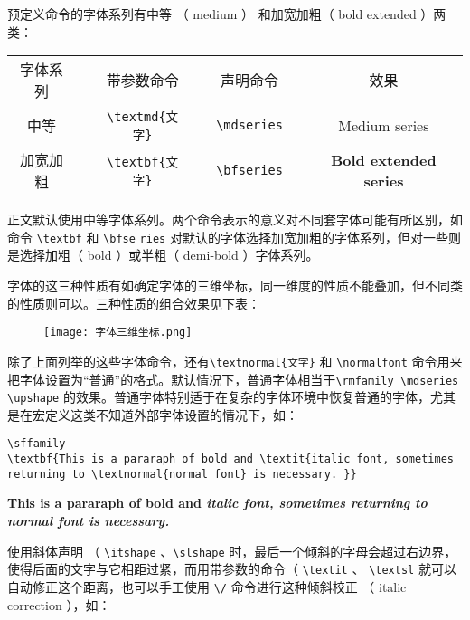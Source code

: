 预定义命令的字体系列有中等 （ medium ） 和加宽加粗（ bold extended ）两类：
\begin{table}[H]
    \centering
    \begin{tabular}{ccccccc}
        字体系列 && 带参数命令 && 声明命令 && 效果 \\ 
        中等 && \verb|\textmd{文字}| && \verb|\mdseries| && \textmd{Medium series} \\ 
        加宽加粗 && \verb|\textbf{文字}|  && \verb|\bfseries| && \textbf{Bold extended series} \\
    \end{tabular}
\end{table}

正文默认使用中等字体系列。两个命令表示的意义对不同套字体可能有所区别，如命令 \verb|\textbf| 和
 \verb|\bfse| \verb|ries| 对默认的字体选择加宽加粗的字体系列，但对一些则是选择加粗（ bold ）或半粗（ demi-bold ）字体系列。

字体的这三种性质有如确定字体的三维坐标，同一维度的性质不能叠加，但不同类的性质则可以。三种性质的组合效果见下表：

\begin{figure}[H]
    \centering
    \texttt{[image: 字体三维坐标.png]}
\end{figure}

除了上面列举的这些字体命令，还有\verb|\textnormal{文字}| 和 \verb|\normalfont| 命令用来把字体设置为“普通”的格式。默认情况下，普通字体相当于\verb|\rmfamily \mdseries \upshape| 的效果。普通字体特别适于在复杂的字体环境中恢复普通的字体，尤其是在宏定义这类不知道外部字体设置的情况下，如：

\begin{minipage}[t]{0.45\textwidth}
\begin{lstlisting}
\sffamily
\textbf{This is a pararaph of bold and \textit{italic font, sometimes returning to \textnormal{normal font} is necessary. }}
\end{lstlisting}
\end{minipage}
\hfill
\begin{minipage}[t]{0.45\textwidth}
    \sffamily
    \textbf{This is a pararaph of bold and \textit{italic font, sometimes returning to \textnormal{normal font} is necessary. }}
\end{minipage}

使用斜体声明 （ \verb|\itshape| 、\verb|\slshape| 时，最后一个倾斜的字母会超过右边界，使得后面的文字与它相距过紧，而用带参数的命令（ \verb|\textit| 、 \verb|\textsl| 就可以自动修正这个距离，也可以手工使用 \verb|\/| 命令进行这种倾斜校正 （ italic correction ），如：

